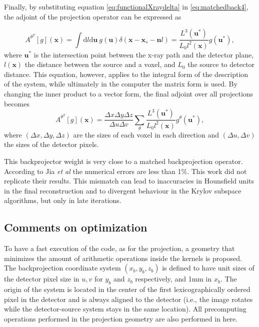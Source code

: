Finally, by substituting equation \ref{eq:functionalXraydelta} in \ref{eq:matchedback4}, the adjoint of the projection operator can be expressed as

\begin{equation}
A^{\theta^T}[g](\textbf{x})=\int\mathrm{d}l\mathrm{d}\textbf{u} \ g(\textbf{u})\delta(\textbf{x}-\textbf{x}_s-\textbf{n}l)=\frac{L^3(\textbf{u}^*)}{L_0l^2(\textbf{x})}g(\textbf{u}^*),
\end{equation}
where $\textbf{u}^*$ is the intersection point between the x-ray path and the detector plane, $l(\textbf{x})$ the distance between the source and a voxel, and $L_0$ the source to detector distance. This equation, however, applies to the integral form of the description of the system, while ultimately in the computer the matrix form is used. By changing the inner product to a vector form, the final adjoint over all projections becomes
\begin{equation}
A^{\theta^T}[g](\textbf{x})=\frac{\Delta x \Delta y \Delta z}{\Delta u \Delta v}\sum_\theta\frac{L^3(\textbf{u}^*)}{L_0l^2(\textbf{x})}g^\theta(\textbf{u}^*),\label{eq:finalmatched}
\end{equation}
where $(\Delta x,\Delta y,\Delta z)$ are the sizes of each voxel in each direction and $(\Delta u,\Delta v)$ the sizes of the detector pixels. 

This backprojector weight is very close to a matched backprojection operator. According to Jia \textit{et al} the numerical errors are less than 1\%. This work did not replicate their results. This mismatch can lead to inaccuracies in Hounsfield units in the final reconstruction and to divergent behaviour in the Krylov subspace algorithms, but only in late iterations.

\subsection{Comments on optimization}

To have a fast execution of the code, as for the projection, a geometry that minimizes the amount of arithmetic operations inside the kernels is proposed. The backprojection coordinate system $(x_b,y_b,z_b)$ is defined to have unit sizes of the detector pixel size in $u,v$ for $y_b$ and $z_b$ respectively, and 1mm in $x_b$. The origin of the system is located in the center of the first lexicographically ordered pixel in the detector and is always aligned to the detector (i.e., the image rotates while the detector-source system stays in the same location).  All precomputing operations performed in the projection geometry are also performed in here.

